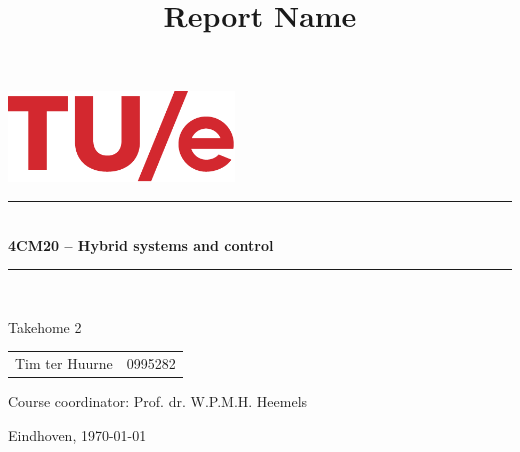 \documentclass[a4paper,1cm]{article}
\title{Report Name}
\newcommand{\HRule}{\rule{\linewidth}{0.5mm}}
\numberwithin{equation}{section}
\numberwithin{figure}{section}
\numberwithin{table}{section}
\begin{document}
\begin{titlepage}
\begin{center} 


\includegraphics[width=6cm]{TUelogo.png}\\


\vspace*{2cm}
\HRule \\[0.4cm] { \Large \bfseries 4CM20 – Hybrid systems and control}\\[0.3cm] \HRule \\[1.5cm]

\vspace*{1cm}

\begin{center}
{\huge Takehome 2}\\
\vspace*{1cm}

\end{center}

\vspace*{2cm}

\begin{minipage}{\textwidth}\large
\begin{center}
\begin{tabular}{l r}
    
    Tim ter Huurne & 0995282\\
\end{tabular}
\end{center}
\vspace{5mm}
\begin{center}
\vspace{5mm}
Course coordinator: Prof. dr. W.P.M.H. Heemels\\
\end{center}
\end{minipage}

\vfill
\large
Eindhoven, \today\\
\end{center}
\end{titlepage}
\endcenter
{}
\newpage

\tableofcontents


\newpage
\end{document}
